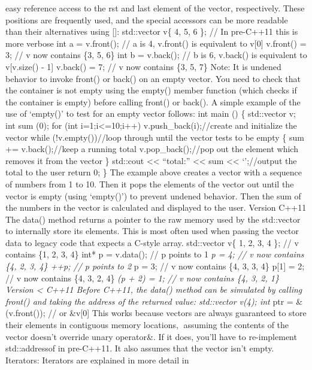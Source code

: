 easy reference access to the rst and last element of the vector,
respectively. These positions are frequently used, and the special
accessors can be more readable than their alternatives using {[}{]}:
std::vector v\{ 4, 5, 6 \}; // In pre-C++11 this is more verbose int a =
v.front(); // a is 4, v.front() is equivalent to v{[}0{]} v.front() = 3;
// v now contains \{3, 5, 6\} int b = v.back(); // b is 6, v.back() is
equivalent to v{[}v.size() - 1{]} v.back() = 7; // v now contains \{3,
5, 7\} Note: It is undened behavior to invoke front() or back() on an
empty vector. You need to check that the container is not empty using
the empty() member function (which checks if the container is empty)
before calling front() or back(). A simple example of the use of
`empty()' to test for an empty vector follows: int main () \{
std::vector v; int sum (0); for (int i=1;i\textless=10;i++)
v.push\_back(i);//create and initialize the vector while
(!v.empty())//loop through until the vector tests to be empty \{ sum +=
v.back();//keep a running total v.pop\_back();//pop out the element
which removes it from the vector \} std::cout \textless\textless{}
``total:'' \textless\textless{} sum \textless\textless{} `\n';//output
the total to the user return 0; \} The example above creates a vector
with a sequence of numbers from 1 to 10. Then it pops the elements of
the vector out until the vector is empty (using `empty()') to prevent
undened behavior. Then the sum of the numbers in the vector is
calculated and displayed to the user. Version C++11 The data() method
returns a pointer to the raw memory used by the std::vector to
internally store its elements. This is most often used when passing the
vector data to legacy code that expects a C-style array. std::vector v\{
1, 2, 3, 4 \}; // v contains \{1, 2, 3, 4\} int* p = v.data(); // p
points to 1 \emph{p = 4; // v now contains \{4, 2, 3, 4\} ++p; // p
points to 2 }p = 3; // v now contains \{4, 3, 3, 4\} p{[}1{]} = 2; // v
now contains \{4, 3, 2, 4\} \emph{(p + 2) = 1; // v now contains \{4, 3,
2, 1\} Version \textless{} C++11 Before C++11, the data() method can be
simulated by calling front() and taking the address of the returned
value: std::vector v(4); int} ptr = \&(v.front()); // or \&v{[}0{]} This
works because vectors are always guaranteed to store their elements in
contiguous memory locations, assuming the contents of the vector
doesn't override unary operator\&. If it does, you'll have to
re-implement std::addressof in pre-C++11. It also assumes that the
vector isn't empty. Iterators: Iterators are explained in more detail in
